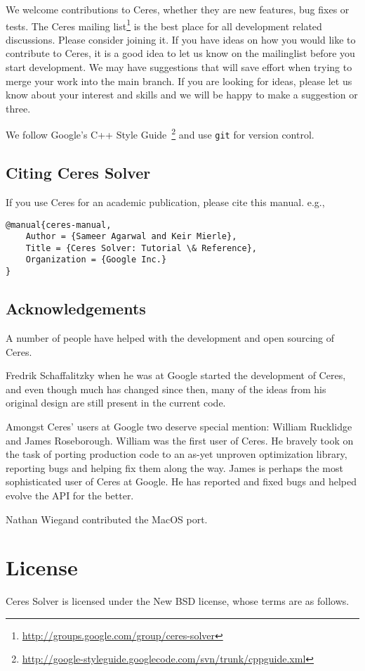We welcome contributions to Ceres, whether they are new features, bug fixes or tests. The Ceres mailing list\footnote{\url{http://groups.google.com/group/ceres-solver}} is the best place for all development related discussions. Please consider joining it. If you have ideas on how you would like to contribute to Ceres, it is a good idea to let us know on the mailinglist before you start development. We may have suggestions that will save effort when trying to merge your work into the main branch. If you are looking for ideas, please let us know about your interest and skills and we will be happy to make a suggestion or three.

We follow Google's C++ Style Guide~\footnote{\url{http://google-styleguide.googlecode.com/svn/trunk/cppguide.xml}} and use \texttt{git} for version control.

\section{Citing Ceres Solver}
If you use Ceres for an academic publication, please cite this manual. e.g.,
\begin{verbatim}
@manual{ceres-manual,
	Author = {Sameer Agarwal and Keir Mierle},
	Title = {Ceres Solver: Tutorial \& Reference},
	Organization = {Google Inc.}
}
\end{verbatim}
	

\section{Acknowledgements}
A number of people have helped with the development and open sourcing of Ceres. 

Fredrik Schaffalitzky when he was at Google started the development of Ceres, and even though much has changed since then, many of the ideas from his original design are still present in the current code.

Amongst Ceres' users at Google two deserve special mention: William Rucklidge and James Roseborough. William was the first user of Ceres. He bravely took on the task of porting production code to an as-yet unproven optimization library, reporting bugs and helping fix them along the way. James is perhaps the most sophisticated user of Ceres at Google. He has reported and fixed bugs and helped evolve the API for the better.

Nathan Wiegand contributed the MacOS port.


\chapter{License}
Ceres Solver is licensed under the New BSD license, whose terms are as follows.

